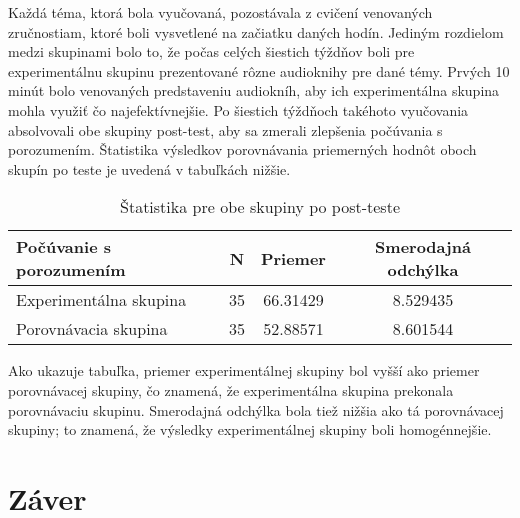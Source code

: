 \documentclass[10pt,twoside,slovak,a4paper]{article}
\begin{document}
Každá téma, ktorá bola vyučovaná, pozostávala z cvičení venovaných zručnostiam, ktoré boli vysvetlené na začiatku daných hodín. Jediným rozdielom medzi skupinami bolo to, že počas celých šiestich týždňov boli pre experimentálnu skupinu prezentované rôzne audioknihy pre dané témy. Prvých 10 minút bolo venovaných predstaveniu audiokníh, aby ich experimentálna skupina mohla využiť čo najefektívnejšie. Po šiestich týždňoch takéhoto vyučovania absolvovali obe skupiny post-test, aby sa zmerali zlepšenia počúvania s porozumením. Štatistika výsledkov porovnávania priemerných hodnôt oboch skupín po teste je uvedená v tabuľkách nižšie.\\




\begin{table}[tbh]
\centering
\begin{tabular}{@{}|l|c|c|c|@{}}
\toprule
Počúvanie s porozumením & N  & Priemer  & Smerodajná odchýlka \\ \midrule
Experimentálna skupina  & 35 & 66.31429 & 8.529435            \\ \midrule
Porovnávacia skupina    & 35 & 52.88571 & 8.601544            \\ \bottomrule
\end{tabular}
\caption{\label{tab:Štatistika}Štatistika pre obe skupiny po post-teste}
\end{table}

Ako ukazuje tabuľka, priemer experimentálnej skupiny bol vyšší ako priemer porovnávacej skupiny, čo znamená, že experimentálna skupina prekonala porovnávaciu skupinu. Smerodajná odchýlka bola tiež nižšia ako tá porovnávacej skupiny; to znamená, že výsledky experimentálnej skupiny boli homogénnejšie.



\section{Záver} \label{zaver} %






\end{document}
